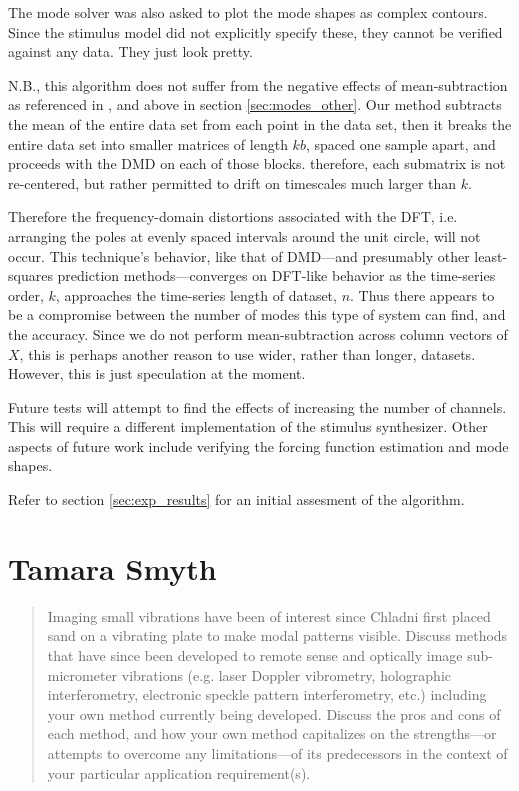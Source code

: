 \documentclass[a4paper,10pt]{report}
\numberwithin{equation}{section}
\begin{document}
The mode solver was also asked to plot the mode shapes as complex contours. Since the stimulus model did not explicitly specify these, they cannot be verified against any data. They just look pretty.

N.B., this algorithm does not suffer from the negative effects of mean-subtraction as referenced in \cite{Chen2012}, and above in section \ref{sec:modes_other}. Our method subtracts the mean of the entire data set from each point in the data set, then it breaks the entire data set into smaller matrices of length $kb$, spaced one sample apart, and proceeds with the DMD on each of those blocks. therefore, each submatrix is not re-centered, but rather permitted to drift on timescales much larger than $k$.

Therefore the frequency-domain distortions associated with the DFT, i.e. arranging the poles at evenly spaced intervals around the unit circle, will not occur. This technique's behavior, like that of DMD---and presumably other least-squares prediction methods---converges on DFT-like behavior as the time-series order, $k$, approaches the time-series length of dataset, $n$. Thus there appears to be a compromise between the number of modes this type of system can find, and the accuracy. Since we do not perform mean-subtraction across column vectors of $X$, this is perhaps another reason to use wider, rather than longer, datasets. However, this is just speculation at the moment.

Future tests will attempt to find the effects of increasing the number of channels. This will require a different implementation of the stimulus synthesizer. Other aspects of future work include verifying the forcing function estimation and mode shapes. 

Refer to section \ref{sec:exp_results} for an initial assesment of the algorithm.

\chapter{Tamara Smyth}
\begin{abstract}
 Imaging small vibrations have been of interest since Chladni first placed sand on a vibrating plate to make modal patterns visible. Discuss methods that have since been developed to remote sense and optically image sub-micrometer vibrations (e.g. laser Doppler vibrometry, holographic interferometry, electronic speckle pattern interferometry, etc.) including your own method currently being developed. Discuss the pros and cons of each method, and how your own method capitalizes on the strengths---or attempts to overcome any limitations---of its predecessors in the context of your particular application requirement(s).
\end{abstract}
\end{document}
